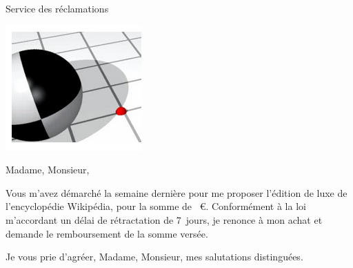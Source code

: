 \documentclass[12pt]{lettre}
\begin{document}
\begin{letter}{Service des réclamations}
\address{Frederic Kerdraon\\6, rue Ghandi\\29260 Lesneven}
\nofax


    \includegraphics[width=.2\textwidth,left]{Logo.png}



\def\concname{Objet :~} %
\opening{Madame, Monsieur,}

Vous m'avez démarché la semaine dernière
pour me proposer l'édition de luxe de l'encyclopédie Wikipédia,
pour la somme de ~\euro.
Conformément à la loi m'accordant un délai de rétractation de 7~jours,
je renonce à mon achat et demande le remboursement de la somme versée.


\closing{Je vous prie d'agréer,
Madame, Monsieur,
mes salutations distinguées.}

\end{letter}
\end{document}

